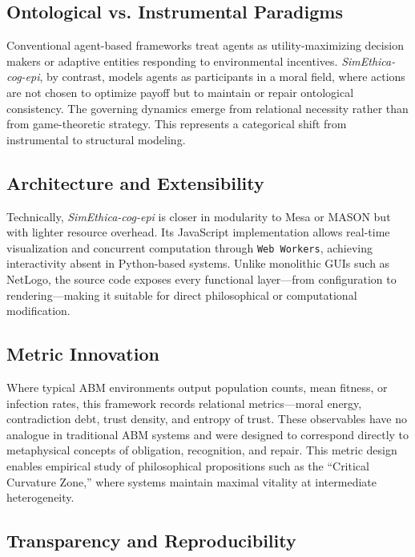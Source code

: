 \documentclass[11pt]{article}
\begin{document}
\subsection{Ontological vs. Instrumental Paradigms}

Conventional agent-based frameworks treat agents as utility-maximizing decision makers or adaptive entities responding to environmental incentives.  
\textit{SimEthica-cog-epi}, by contrast, models agents as participants in a moral field, where actions are not chosen to optimize payoff but to maintain or repair ontological consistency.  
The governing dynamics emerge from relational necessity rather than from game-theoretic strategy.  
This represents a categorical shift from instrumental to structural modeling.

\subsection{Architecture and Extensibility}

Technically, \textit{SimEthica-cog-epi} is closer in modularity to Mesa or MASON but with lighter resource overhead.  
Its JavaScript implementation allows real-time visualization and concurrent computation through \texttt{Web Workers}, achieving interactivity absent in Python-based systems.  
Unlike monolithic GUIs such as NetLogo, the source code exposes every functional layer—from configuration to rendering—making it suitable for direct philosophical or computational modification.

\subsection{Metric Innovation}

Where typical ABM environments output population counts, mean fitness, or infection rates, this framework records relational metrics—moral energy, contradiction debt, trust density, and entropy of trust.  
These observables have no analogue in traditional ABM systems and were designed to correspond directly to metaphysical concepts of obligation, recognition, and repair.  
This metric design enables empirical study of philosophical propositions such as the “Critical Curvature Zone,” where systems maintain maximal vitality at intermediate heterogeneity.

\subsection{Transparency and Reproducibility}
\end{document}
